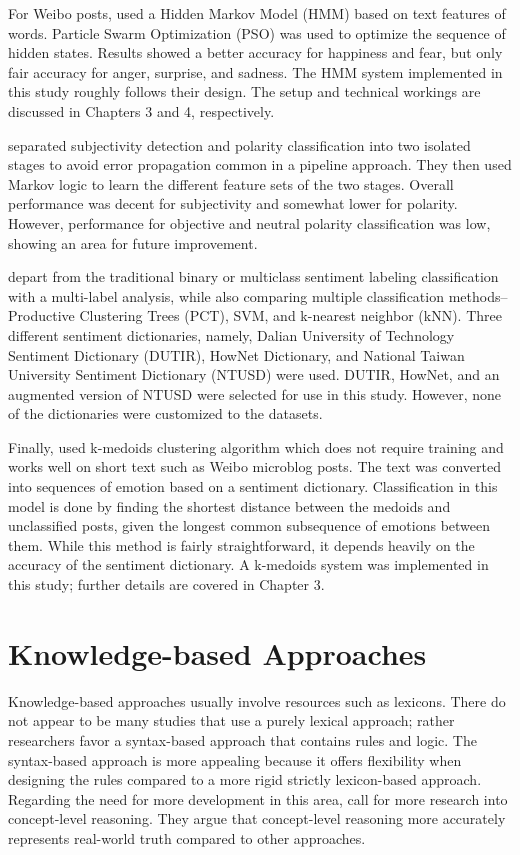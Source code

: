 \documentclass [11pt, proquest] {uwthesis}[2020/02/24]
\begin{document}
For Weibo posts, \cite{Liu2015} used a Hidden Markov Model (HMM) based on text features of words. Particle Swarm Optimization (PSO) was used to optimize the sequence of hidden states. Results showed a better accuracy for happiness and fear, but only fair accuracy for anger, surprise, and sadness. The HMM system implemented in this study roughly follows their design. The setup and technical workings are discussed in Chapters 3 and 4, respectively.

\cite{Chen2015} separated subjectivity detection and polarity classification into two isolated stages to avoid error propagation common in a pipeline approach. They then used Markov logic to learn the different feature sets of the two stages. Overall performance was decent for subjectivity and somewhat lower for polarity. However, performance for objective and neutral polarity classification was low, showing an area for future improvement. 

\cite{Liu2015a} depart from the traditional binary or multiclass sentiment labeling classification with a multi-label analysis, while also comparing multiple classification methods--Productive Clustering Trees (PCT), SVM, and k-nearest neighbor (kNN). Three different sentiment dictionaries, namely, Dalian University of Technology Sentiment Dictionary (DUTIR), HowNet Dictionary, and National Taiwan University Sentiment Dictionary (NTUSD) were used. DUTIR, HowNet, and an augmented version of NTUSD were selected for use in this study. However, none of the dictionaries were customized to the datasets.

Finally, \cite{Wei2014} used k-medoids clustering algorithm which does not require training and works well on short text such as  Weibo microblog posts. The text was converted into sequences of emotion based on a sentiment dictionary. Classification in this model is done by finding the shortest distance between the medoids and unclassified posts, given the longest common subsequence of emotions between them. While this method is fairly straightforward, it depends heavily on the accuracy of the sentiment dictionary. A k-medoids system was implemented in this study; further details are covered in Chapter 3.
\section{Knowledge-based Approaches}
Knowledge-based approaches usually involve resources such as lexicons. There do not appear to be many studies that use a purely lexical approach; rather researchers favor a syntax-based approach that contains rules and logic. The syntax-based approach is more appealing because it offers flexibility when designing the rules compared to a more rigid strictly lexicon-based approach. Regarding the need for more development in this area, \cite{Cambria2015} call for more research into concept-level reasoning. They argue that concept-level reasoning more accurately represents real-world truth compared to other approaches.
\end{document}
